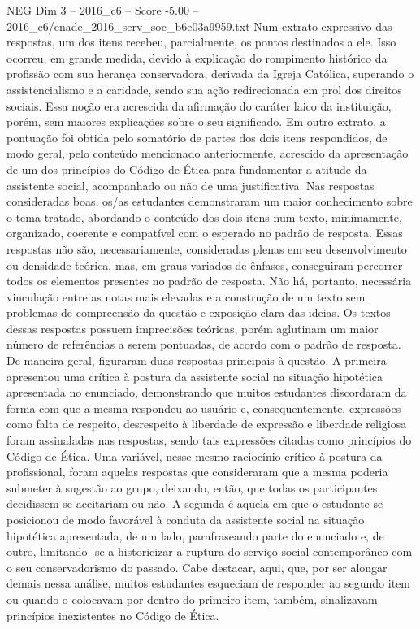 \begin{textsample}{NEG Dim 3 – 2016\_c6 – Score -5.00 – 2016\_c6/enade\_2016\_serv\_soc\_b6e03a9959.txt}
Num extrato expressivo das respostas, um dos itens recebeu, parcialmente, os pontos destinados a ele.
Isso ocorreu, em grande medida, devido à explicação do rompimento histórico da profissão com sua herança conservadora, derivada da Igreja Católica, superando o assistencialismo e a caridade, sendo sua ação redirecionada em prol dos direitos sociais.
Essa noção era acrescida da afirmação do caráter laico da instituição, porém, sem maiores explicações sobre o seu significado.
Em outro extrato, a pontuação foi obtida pelo somatório de partes dos dois itens respondidos, de modo geral, pelo conteúdo mencionado anteriormente, acrescido da apresentação de um dos princípios do Código de Ética para fundamentar a atitude da assistente social, acompanhado ou não de uma justificativa.
Nas respostas consideradas boas, os/as estudantes demonstraram um maior conhecimento sobre o tema tratado, abordando o conteúdo dos dois itens num texto, minimamente, organizado, coerente e compatível com o esperado no padrão de resposta.
Essas respostas não são, necessariamente, consideradas plenas em seu desenvolvimento ou densidade teórica, mas, em graus variados de ênfases, conseguiram percorrer todos os elementos presentes no padrão de resposta.
Não há, portanto, necessária vinculação entre as notas mais elevadas e a construção de um texto sem problemas de compreensão da questão e exposição clara das ideias.
Os textos dessas respostas possuem imprecisões teóricas, porém aglutinam um maior número de referências a serem pontuadas, de acordo com o padrão de resposta.
De maneira geral, figuraram duas respostas principais à questão.
A primeira apresentou uma crítica à postura da assistente social na situação hipotética apresentada no enunciado, demonstrando que muitos estudantes discordaram da forma com que a mesma respondeu ao usuário e, consequentemente, expressões como falta de respeito, desrespeito à liberdade de expressão e liberdade religiosa foram assinaladas nas respostas, sendo tais expressões citadas como princípios do Código de Ética.
Uma variável, nesse mesmo raciocínio crítico à postura da profissional, foram aquelas respostas que consideraram que a mesma poderia submeter à sugestão ao grupo, deixando, então, que todas os participantes decidissem se aceitariam ou não.
A segunda é aquela em que o estudante se posicionou de modo favorável à conduta da assistente social na situação hipotética apresentada, de um lado, parafraseando parte do enunciado e, de outro, limitando -se a historicizar a ruptura do serviço social contemporâneo com o seu conservadorismo do passado.
Cabe destacar, aqui, que, por ser alongar demais nessa análise, muitos estudantes esqueciam de responder ao segundo item ou quando o colocavam por dentro do primeiro item, também, sinalizavam princípios inexistentes no Código de Ética.

\end{textsample}
